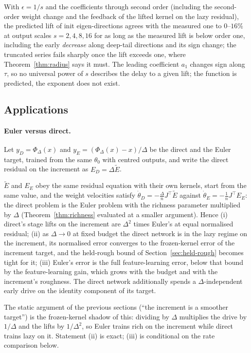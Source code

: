 \begin{remark}[Verification, n=200]
With $\epsilon=1/s$ and the coefficients through second order (including the
second-order weight change and the feedback of the lifted kernel on the lazy
residual), the predicted lift of init eigen-directions agrees with the
measured one to $0$--$16\%$ at output scales $s=2,4,8,16$ for as long as the
measured lift is below order one, including the early \emph{decrease} along
deep-tail directions and its sign change; the truncated series fails sharply
once the lift exceeds one, where Theorem~\ref{thm:radius} says it must. The
leading coefficient $a_1$ changes sign along $\tau$, so no universal power of
$s$ describes the delay to a given lift; the function is predicted, the
exponent does not exist.
\end{remark}

\subsection{Applications}
\label{ssec:chain-apps}

\paragraph{Euler versus direct.} Let $y_D=\Phi_\Delta(x)$ and
$y_E=(\Phi_\Delta(x)-x)/\Delta$ be the direct and the Euler target, trained from
the same $\theta_0$ with centred outputs, and write the direct residual on the
increment as $E_D=\Delta\tilde E$.
\begin{theorem}
\label{thm:euler}
$\tilde E$ and $E_E$ obey the same residual equation with their own kernels,
start from the same value, and the weight velocities satisfy
$\dot\theta_D=-\frac\Delta nJ^{\!\top}\tilde E$ against
$\dot\theta_E=-\frac1nJ^{\!\top}E_E$: the direct problem is the Euler problem with
the richness parameter multiplied by $\Delta$ (Theorem~\ref{thm:richness}
evaluated at a smaller argument). Hence (i) direct's stage lifts on the
increment are $\Delta^2$ times Euler's at equal normalised residual; (ii) as
$\Delta\to0$ at fixed budget the direct network is in the lazy regime on the
increment, its normalised error converges to the frozen-kernel error of the
increment target, and the held-rough bound of Section~\ref{sec:held-rough}
becomes tight for it; (iii) Euler's error is the full feature-learning error,
below that bound by the feature-learning gain, which grows with the budget
and with the increment's roughness. The direct network additionally spends a
$\Delta$-independent early drive on the identity component of its target.
\end{theorem}
The static argument of the previous sections (``the increment is a smoother
target'') is the frozen-kernel shadow of this: dividing by $\Delta$ multiplies the
drive by $1/\Delta$ and the lifts by $1/\Delta^2$, so Euler trains rich on the
increment while direct trains lazy on it. Statement (ii) is exact; (iii) is
conditional on the rate comparison below.

